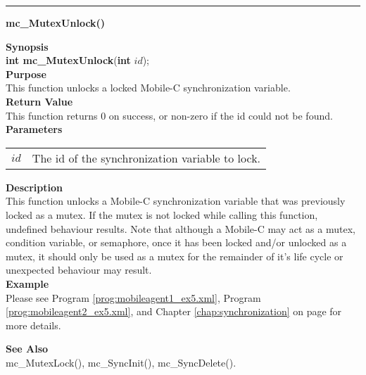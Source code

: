 \noindent
\vspace{5pt}
\rule{6.5in}{0.015in}
\noindent
{}
{\LARGE \bf mc\_MutexUnlock()}\\

\noindent
{\bf Synopsis}\\
{\bf int mc\_MutexUnlock}({\bf int} $id$);\\

\noindent
{\bf Purpose}\\
This function unlocks a locked Mobile-C synchronization variable.\\

\noindent
{\bf Return Value}\\
This function returns 0 on success, or non-zero if the id could not be found.\\

\noindent
{\bf Parameters}
\vspace{-0.1pt}
\begin{description}
\item
\begin{tabular}{p{10 mm}p{145 mm}} 
$id$ & The id of the synchronization variable to lock. 
\end{tabular}
\end{description}

\noindent
{\bf Description}\\
This function unlocks a Mobile-C synchronization variable that was previously
locked as a mutex. 
If the mutex is not locked while calling this function, undefined behaviour 
results.
Note that although a Mobile-C may act as a mutex, condition variable, or 
semaphore, once it has been locked and/or unlocked as a mutex, it should only 
be used as a mutex for the remainder of it's life cycle or unexpected 
behaviour may result.\\

\noindent
{\bf Example}\\
Please see Program \vref{prog:mobileagent1_ex5.xml}, Program 
\vref{prog:mobileagent2_ex5.xml}, and Chapter \ref{chap:synchronization}
on page \pageref{chap:synchronization} for more details.\\
\noindent

\noindent
{\bf See Also}\\
mc\_MutexLock(), mc\_SyncInit(), mc\_SyncDelete().\\

